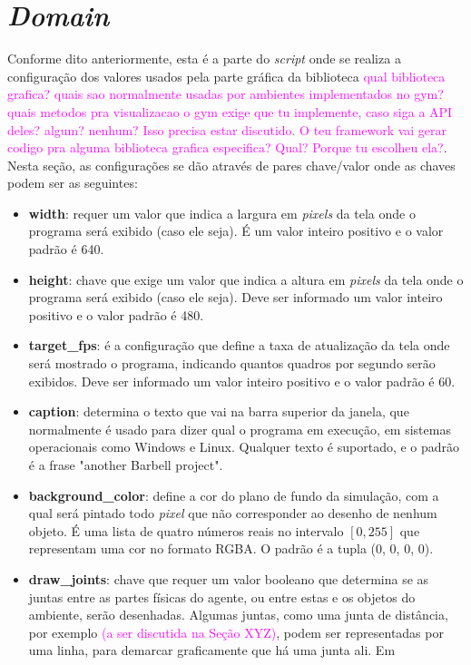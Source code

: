 \documentclass[cic,tc]{iiufrgs}
\newcommand\bruno[1]{\textcolor{magenta}{#1}}
\begin{document}
    \section{\textit{Domain}}
    Conforme dito anteriormente, esta é a parte do \textit{script} onde se realiza a configuração dos valores usados
    pela parte gráfica da biblioteca \bruno{qual biblioteca grafica? quais sao normalmente usadas por ambientes implementados no gym? quais metodos pra visualizacao o gym exige que tu implemente, caso siga a API deles? algum? nenhum? Isso precisa estar discutido. O teu framework vai gerar codigo pra alguma biblioteca grafica especifica? Qual? Porque tu escolheu ela?}. Nesta seção, as configurações se dão através de pares chave/valor onde as chaves podem ser as seguintes:
    \begin{itemize}
      \item \textbf{width}: requer um valor que indica a largura em \textit{pixels} da tela onde o programa será exibido (caso ele seja). É um valor
      inteiro positivo e o valor padrão é 640.
      \item \textbf{height}: chave que exige um valor que indica a altura em \textit{pixels} da tela onde o programa será exibido (caso ele seja). Deve ser informado
      um valor inteiro positivo e o valor padrão é 480.
      \item \textbf{target\_fps}: é a configuração que define a taxa de atualização da tela onde será mostrado o programa, indicando quantos quadros
      por segundo serão exibidos. Deve ser informado um valor inteiro positivo e o valor padrão é 60.
      \item \textbf{caption}: determina o texto que vai na barra superior da janela, que normalmente é usado para dizer qual o programa em execução,
      em sistemas operacionais como Windows e Linux. Qualquer texto é suportado, e o padrão é a frase "another Barbell project".
      \item \textbf{background\_color}: define a cor do plano de fundo da simulação, com a qual será pintado todo \textit{pixel} que não corresponder
      ao desenho de nenhum objeto. É uma lista de quatro números reais no intervalo $[0, 255]$ que representam uma cor no formato RGBA. O padrão é a tupla (0, 0, 0, 0).
      \item \textbf{draw\_joints}: chave que requer um valor booleano que determina se as juntas entre as partes físicas do agente, ou entre estas e os objetos do ambiente, serão desenhadas. Algumas juntas, como uma junta de distância, por exemplo \bruno{(a ser discutida na Seção XYZ)}, podem ser representadas por uma linha, para demarcar graficamente que há uma junta ali. Em

\end{itemize}
\end{document}
